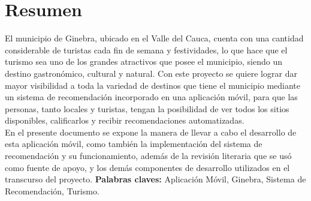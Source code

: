 \documentclass[12pt,letterpaper,openany]{book}
\begin{document}
\chapter*{Resumen} %
El municipio de Ginebra, ubicado en el Valle del Cauca, cuenta con una cantidad considerable de turistas cada fin de semana y festividades, lo que hace que el turismo sea uno de los grandes atractivos que posee el municipio, siendo un destino gastronómico, cultural y natural. Con este proyecto se quiere lograr dar mayor visibilidad a toda la variedad de destinos que tiene el municipio mediante un sistema de recomendación incorporado en una aplicación móvil, para que las personas, tanto locales y turistas, tengan la posibilidad de ver todos los sitios disponibles, calificarlos y recibir recomendaciones automatizadas.\\
En el presente documento se expone la manera de llevar a cabo el desarrollo de esta aplicación móvil, como también la implementación del sistema de recomendación y su funcionamiento, además de la revisión literaria que se usó como fuente de apoyo, y los demás componentes de desarrollo utilizados en el transcurso del proyecto.
\vspace{5mm}\newline
\textbf{Palabras claves:} Aplicación Móvil, Ginebra, Sistema de Recomendación, Turismo.


\end{document}
